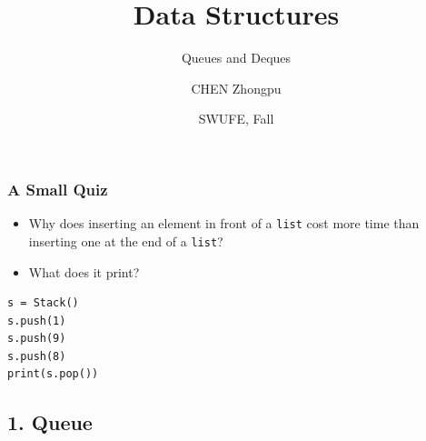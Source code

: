 \documentclass[aspectratio=169, 14pt]{beamer}
\title[Data Structures] %
{Data Structures}
\subtitle{Queues and Deques}
\author[CHEN Zhongpu] %
{CHEN Zhongpu}
\institute[] %
{
	School of Computing and Artificial Intelligence \\
	\href{mailto:zpchen@swufe.edu.cn}{zpchen@swufe.edu.cn}
}
\date[] %
{SWUFE, Fall \the\year{}}
\begin{document}
\frame{\titlepage}

\begin{frame}[fragile]
	\frametitle{A Small Quiz}
	\begin{itemize}
		\item Why does inserting an element in front of a \texttt{list} cost more time than inserting one at the end of a \texttt{list}?
	\end{itemize}
	\begin{itemize}
		\item What does it print?
	\end{itemize}

	\begin{verbatim}
s = Stack()
s.push(1)   
s.push(9)
s.push(8)
print(s.pop())
\end{verbatim}
\end{frame}

{
\begin{frame}
	\section{\textcolor{darkmidnightblue}{1. Queue}}
\end{frame}
}
\end{document}
